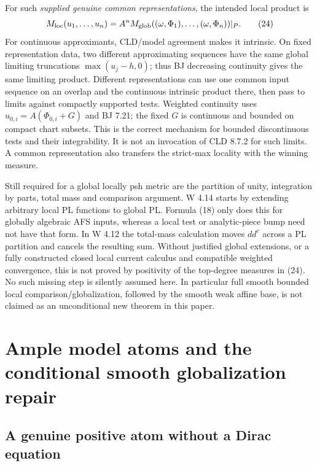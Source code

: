 \documentclass[
  11pt,
]{article}
\begin{document}
For such \emph{supplied genuine common representations}, the intended
local product is \[M_{\rm loc}(u_1,\ldots,u_n)=A^n
       M_{\rm glob}((\omega,\Phi_1),\ldots,(\omega,\Phi_n))|_P.         \tag{24}\]
For continuous approximants, CLD/model agreement makes it intrinsic. On
fixed representation data, two different approximating sequences have
the same global limiting truncations \(\max(u_j-h,0)\); thus BJ
decreasing continuity gives the same limiting product. Different
representations can use one common input sequence on an overlap and the
continuous intrinsic product there, then pass to limits against
compactly supported tests. Weighted continuity uses
\(u_{0,i}=A(\Phi_{0,i}+G)\) and BJ 7.21; the fixed \(G\) is continuous
and bounded on compact chart subsets. This is the correct mechanism for
bounded discontinuous tests and their integrability. It is not an
invocation of CLD 8.7.2 for such limits. A common representation also
transfers the strict-max locality with the winning measure.

Still required for a global locally psh metric are the partition of
unity, integration by parts, total mass and comparison argument. W 4.14
starts by extending arbitrary local PL functions to global PL. Formula
(18) only does this for globally algebraic AFS inputs, whereas a local
test or analytic-piece bump need not have that form. In W 4.12 the
total-mass calculation moves \(dd^c\) across a PL partition and cancels
the resulting sum. Without justified global extensions, or a fully
constructed closed local current calculus and compatible weighted
convergence, this is not proved by positivity of the top-degree measures
in (24). No such missing step is silently assumed here. In particular
full smooth bounded local comparison/globalization, followed by the
smooth weak affine base, is not claimed as an unconditional new theorem
in this paper.

\section{Ample model atoms and the conditional smooth globalization
repair}\label{ample-model-atoms-and-the-conditional-smooth-globalization-repair}

\subsection{A genuine positive atom without a Dirac
equation}\label{a-genuine-positive-atom-without-a-dirac-equation}
\end{document}
